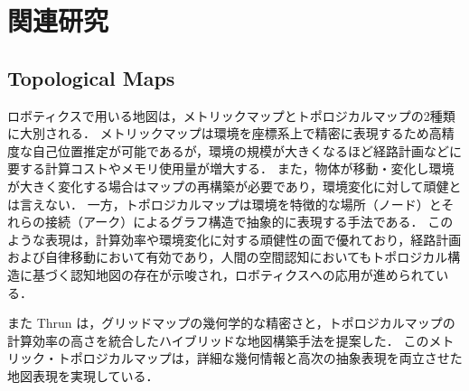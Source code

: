 \documentclass[conference]{IEEEtran}
\begin{document}
\section{関連研究}

\subsection{Topological Maps}
ロボティクスで用いる地図は，メトリックマップとトポロジカルマップの2種類に大別される．
メトリックマップは環境を座標系上で精密に表現するため高精度な自己位置推定が可能であるが，環境の規模が大きくなるほど経路計画などに要する計算コストやメモリ使用量が増大する．
また，物体が移動・変化し環境が大きく変化する場合はマップの再構築が必要であり，環境変化に対して頑健とは言えない．
一方，トポロジカルマップは環境を特徴的な場所（ノード）とそれらの接続（アーク）によるグラフ構造で抽象的に表現する手法である．
このような表現は，計算効率や環境変化に対する頑健性の面で優れており，経路計画および自律移動において有効であり，人間の空間認知においてもトポロジカル構造に基づく認知地図の存在が示唆され，ロボティクスへの応用が進められている\cite{ref:Metric-Topological,ref:Navigation-in-hybrid-metric-topological-maps}．


また Thrun \cite{ref:Metric-Topological}は，グリッドマップの幾何学的な精密さと，トポロジカルマップの計算効率の高さを統合したハイブリッドな地図構築手法を提案した．
このメトリック・トポロジカルマップは，詳細な幾何情報と高次の抽象表現を両立させた地図表現を実現している．
\end{document}
